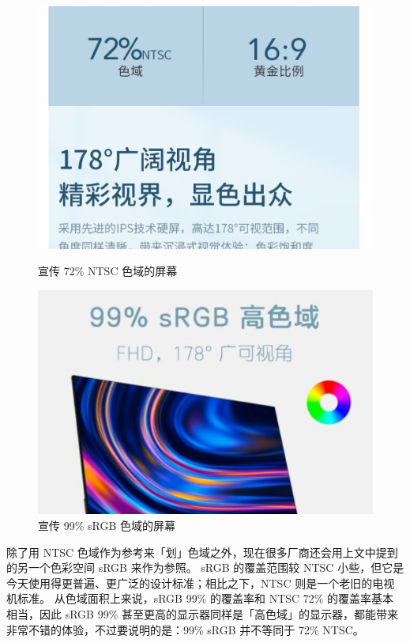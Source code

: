 \begin{figure}[htb!]
  \begin{minipage}{.47\textwidth}
    \centering
    \includegraphics[width=.98\textwidth]{assets/72_NTSC_Ad.jpg}
    \caption{宣传 72\% NTSC 色域的屏幕}
    \label{72_NTSC_Ad}
  \end{minipage}
  \quad
  \begin{minipage}{.47\textwidth}
    \centering
    \includegraphics[width=.98\textwidth]{assets/99_sRGB_Ad.jpg}
    \caption{宣传 99\% sRGB 色域的屏幕}
    \label{99_sRGB_Ad}
  \end{minipage}
\end{figure}

除了用 NTSC 色域作为参考来「划」色域之外，现在很多厂商还会用上文中提到的另一个色彩空间 sRGB 来作为参照。
sRGB 的覆盖范围较 NTSC 小些，但它是今天使用得更普遍、更广泛的设计标准；相比之下，NTSC 则是一个老旧的电视机标准。
从色域面积上来说，sRGB 99\% 的覆盖率和 NTSC 72\% 的覆盖率基本相当，因此 sRGB 99\% 甚至更高的显示器同样是「高色域」的显示器，都能带来非常不错的体验，不过要说明的是：99\% sRGB 并不等同于 72\% NTSC。

